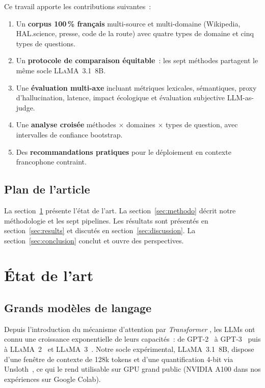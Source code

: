 \documentclass[10pt,journal,compsoc]{IEEEtran}
\begin{document}
Ce travail apporte les contributions suivantes~:

\begin{enumerate}
  \item Un \textbf{corpus 100\,\% français} multi-source et multi-domaine
        (Wikipedia, HAL.science, presse, code de la route) avec quatre
        types de domaine et cinq types de questions.
  \item Un \textbf{protocole de comparaison équitable}~: les sept méthodes
        partagent le même socle \textsc{LLaMA}~3.1~8B.
  \item Une \textbf{évaluation multi-axe} incluant métriques lexicales,
        sémantiques, proxy d'hallucination, latence, impact écologique
        et évaluation subjective LLM-as-judge.
  \item Une \textbf{analyse croisée} méthodes $\times$ domaines $\times$
        types de question, avec intervalles de confiance bootstrap.
  \item Des \textbf{recommandations pratiques} pour le déploiement en
        contexte francophone contraint.
\end{enumerate}

\subsection{Plan de l'article}

La section~\ref{sec:related} présente l'état de l'art. La
section~\ref{sec:methodo} décrit notre méthodologie et les sept
pipelines. Les résultats sont présentés en section~\ref{sec:results}
et discutés en section~\ref{sec:discussion}. La
section~\ref{sec:conclusion} conclut et ouvre des perspectives.


\section{État de l'art}
\label{sec:related}

\subsection{Grands modèles de langage}

Depuis l'introduction du mécanisme d'attention par \textit{Transformer}
\cite{vaswani2017attention}, les LLMs ont connu une croissance
exponentielle de leurs capacités~: de GPT-2~\cite{radford2019language}
à GPT-3~\cite{brown2020language} puis à
\textsc{LLaMA}~2~\cite{touvron2023llama} et
\textsc{LLaMA}~3~\cite{meta2024llama3}. Notre socle expérimental,
\textsc{LLaMA}~3.1~8B, dispose d'une fenêtre de contexte de 128k tokens
et d'une quantification 4-bit via Unsloth~\cite{unsloth2024}, ce qui
le rend utilisable sur GPU grand public (NVIDIA A100 dans nos
expériences sur Google Colab).
\end{document}
